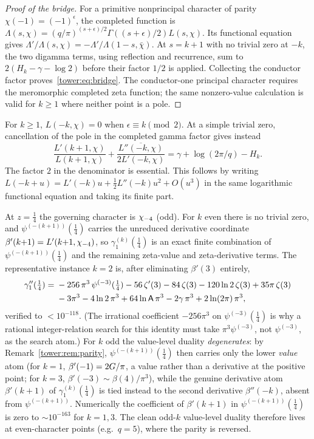 \begin{proof}[Proof of the bridge]
For a primitive nonprincipal character of parity
$\chi(-1)=(-1)^\epsilon$, the completed function is
$\Lambda(s,\chi)=(q/\pi)^{(s+\epsilon)/2}
\Gamma((s+\epsilon)/2)L(s,\chi)$.
Its functional equation gives
$\Lambda'/\Lambda(s,\chi)=-\Lambda'/\Lambda(1-s,\bar\chi)$.
At $s=k+1$ with no trivial zero at $-k$, the two digamma terms,
using reflection and recurrence, sum to
$2(H_k-\gamma-\log2)$ before their factor $1/2$ is applied.
Collecting the conductor factor proves~\eqref{tower:eq:bridge}.
The conductor-one principal character requires the meromorphic completed
zeta function; the same nonzero-value calculation is valid for $k\ge1$
where neither point is a pole.
\end{proof}
\begin{remark}\label{tower:rem:parity}
For $k\ge1$, $L(-k,\chi)=0$ when $\epsilon\equiv k\pmod2$.
At a simple trivial zero, cancellation of the pole in the completed gamma
factor gives instead
\[
\frac{L'(k+1,\chi)}{L(k+1,\chi)}+
\overline{\frac{L''(-k,\chi)}{2L'(-k,\chi)}}
=\gamma+\log(2\pi/q)-H_k.
\]
The factor $2$ in the denominator is essential. This follows by writing
$L(-k+u)=L'(-k)u+\frac12L''(-k)u^2+O(u^3)$ in the same
logarithmic functional equation and taking its finite part.
\end{remark}

At $z=\tfrac14$ the governing character is $\chi_{-4}$ (odd). For $k$ even there is
no trivial zero, and $\psi^{(-(k+1))}(\tfrac14)$ carries the unreduced derivative coordinate $\beta'(k{+}1)=L'(k{+}1,\chi_{-4})$, so $\gamma_1^{(k)}(\tfrac14)$ is an exact
finite combination of $\psi^{(-(k+1))}(\tfrac14)$ and the remaining zeta-value and zeta-derivative terms. The
representative instance $k=2$ is, after eliminating $\beta'(3)$ entirely,
\begin{equation}\label{tower:eq:k2duality}
\begin{aligned}
  \gamma_1''(\tfrac14)=\;&-256\,\pi^3\,\psi^{(-3)}(\tfrac14)
   -56\,\zeta'(3)-84\,\zeta(3)-120\ln2\,\zeta(3)+35\pi\,\zeta(3)\\
   &-3\pi^3-4\ln2\,\pi^3+64\ln\mathsf{A}\,\pi^3-2\gamma\,\pi^3+2\ln(2\pi)\,\pi^3 ,
\end{aligned}
\end{equation}
verified to $<10^{-118}$. (The irrational coefficient $-256\pi^3$ on
$\psi^{(-3)}(\tfrac14)$ is why a rational integer-relation search for this
identity must take $\pi^3\psi^{(-3)}$, not $\psi^{(-3)}$, as the search atom.)
For $k$ odd the value-level duality \emph{degenerates}: by
Remark~\ref{tower:rem:parity}, $\psi^{(-(k+1))}(\tfrac14)$ then carries only the lower
\emph{value} atom (for $k=1$, $\beta'(-1)=2G/\pi$, a value rather than a derivative at the positive point; for $k=3$,
$\beta'(-3)\sim\beta(4)/\pi^3$), while the genuine derivative atom
$\beta'(k{+}1)$ of $\gamma_1^{(k)}(\tfrac14)$ is tied instead to the second
derivative $\beta''(-k)$, absent from $\psi^{(-(k+1))}$. Numerically the
coefficient of $\beta'(k{+}1)$ in $\psi^{(-(k+1))}(\tfrac14)$ is zero to $\sim
10^{-163}$ for $k=1,3$. The clean odd-$k$ value-level duality therefore lives at
even-character points (e.g.\ $q=5$), where the parity is reversed.

